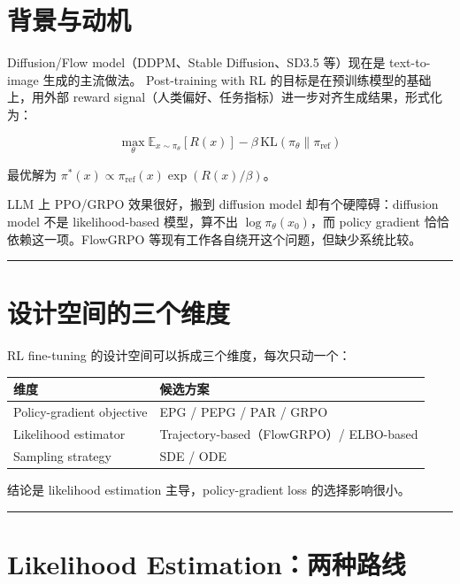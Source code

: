 \section{背景与动机}

Diffusion/Flow model（DDPM、Stable Diffusion、SD3.5 等）现在是 text-to-image 生成的主流做法。
Post-training with RL 的目标是在预训练模型的基础上，用外部 reward signal（人类偏好、任务指标）进一步对齐生成结果，形式化为：

\[
\max_\theta \mathbb{E}_{x \sim \pi_\theta}[R(x)] - \beta \, \mathrm{KL}(\pi_\theta \| \pi_\mathrm{ref})
\]

最优解为 \(\pi^*(x) \propto \pi_\mathrm{ref}(x) \exp(R(x)/\beta)\)。

LLM 上 PPO/GRPO 效果很好，搬到 diffusion model 却有个硬障碍：diffusion model 不是 likelihood-based 模型，算不出 \(\log \pi_\theta(x_0)\)，而 policy gradient 恰恰依赖这一项。FlowGRPO 等现有工作各自绕开这个问题，但缺少系统比较。

\hrule

\section{设计空间的三个维度}

RL fine-tuning 的设计空间可以拆成三个维度，每次只动一个：

\begin{center}
\begin{tabular}{ll}
\toprule
维度 & 候选方案 \\
\midrule
Policy-gradient objective & EPG / PEPG / PAR / GRPO \\
Likelihood estimator & Trajectory-based（FlowGRPO）/ ELBO-based \\
Sampling strategy & SDE / ODE \\
\bottomrule
\end{tabular}
\end{center}

结论是 likelihood estimation 主导，policy-gradient loss 的选择影响很小。

\hrule

\section{Likelihood Estimation：两种路线}

